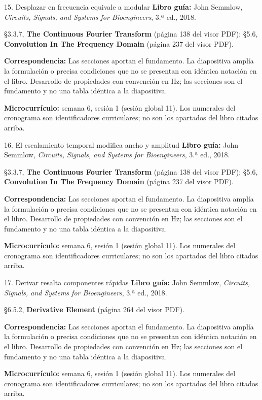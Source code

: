 \documentclass[
  10pt,
  ignorenonframetext,
  aspectratio=169,
  spanish,
]{beamer}
\begin{document}
\begin{frame}{15. Desplazar en frecuencia equivale a modular}
\label{desplazar-en-frecuencia-equivale-a-modular}
\textbf{Libro guía:} John Semmlow, \emph{Circuits, Signals, and Systems
for Bioengineers}, 3.ª ed., 2018.

§3.3.7, \textbf{The Continuous Fourier Transform} (página 138 del visor
PDF); §5.6, \textbf{Convolution In The Frequency Domain} (página 237 del
visor PDF).

\textbf{Correspondencia:} Las secciones aportan el fundamento. La
diapositiva amplía la formulación o precisa condiciones que no se
presentan con idéntica notación en el libro. Desarrollo de propiedades
con convención en Hz; las secciones son el fundamento y no una tabla
idéntica a la diapositiva.

\textbf{Microcurrículo:} semana 6, sesión 1 (sesión global 11). Los
numerales del cronograma son identificadores curriculares; no son los
apartados del libro citados arriba.
\end{frame}

\begin{frame}{16. El escalamiento temporal modifica ancho y amplitud}
\label{el-escalamiento-temporal-modifica-ancho-y-amplitud}
\textbf{Libro guía:} John Semmlow, \emph{Circuits, Signals, and Systems
for Bioengineers}, 3.ª ed., 2018.

§3.3.7, \textbf{The Continuous Fourier Transform} (página 138 del visor
PDF); §5.6, \textbf{Convolution In The Frequency Domain} (página 237 del
visor PDF).

\textbf{Correspondencia:} Las secciones aportan el fundamento. La
diapositiva amplía la formulación o precisa condiciones que no se
presentan con idéntica notación en el libro. Desarrollo de propiedades
con convención en Hz; las secciones son el fundamento y no una tabla
idéntica a la diapositiva.

\textbf{Microcurrículo:} semana 6, sesión 1 (sesión global 11). Los
numerales del cronograma son identificadores curriculares; no son los
apartados del libro citados arriba.
\end{frame}

\begin{frame}{17. Derivar resalta componentes rápidas}
\label{derivar-resalta-componentes-ruxe1pidas}
\textbf{Libro guía:} John Semmlow, \emph{Circuits, Signals, and Systems
for Bioengineers}, 3.ª ed., 2018.

§6.5.2, \textbf{Derivative Element} (página 264 del visor PDF).

\textbf{Correspondencia:} Las secciones aportan el fundamento. La
diapositiva amplía la formulación o precisa condiciones que no se
presentan con idéntica notación en el libro. Desarrollo de propiedades
con convención en Hz; las secciones son el fundamento y no una tabla
idéntica a la diapositiva.

\textbf{Microcurrículo:} semana 6, sesión 1 (sesión global 11). Los
numerales del cronograma son identificadores curriculares; no son los
apartados del libro citados arriba.
\end{frame}
\end{document}
